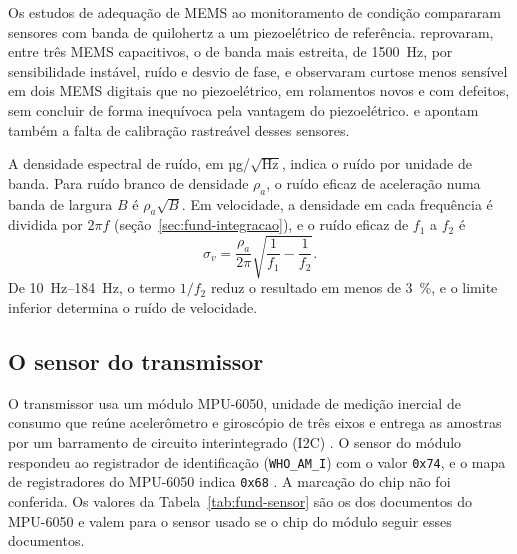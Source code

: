 Os estudos de adequação de MEMS ao monitoramento de condição compararam sensores com banda de quilohertz a um piezoelétrico de referência.  reprovaram, entre três MEMS capacitivos, o de banda mais estreita, de \SI{1500}{\hertz}, por sensibilidade instável, ruído e desvio de fase, e  observaram curtose menos sensível em dois MEMS digitais que no piezoelétrico, em rolamentos novos e com defeitos, sem concluir de forma inequívoca pela vantagem do piezoelétrico.  e  apontam também a falta de calibração rastreável desses sensores.

A densidade espectral de ruído, em µg/$\sqrt{\text{Hz}}$, indica o ruído por unidade de banda. Para ruído branco de densidade $\rho_a$, o ruído eficaz de aceleração numa banda de largura $B$ é $\rho_a\sqrt{B}$. Em velocidade, a densidade em cada frequência é dividida por $2\pi f$ (seção~\ref{sec:fund-integracao}), e o ruído eficaz de $f_1$ a $f_2$ é
\begin{equation}
\sigma_v = \frac{\rho_a}{2\pi}\sqrt{\frac{1}{f_1} - \frac{1}{f_2}}.
\label{eq:fund-ruido-velocidade}
\end{equation}
De \SIrange{10}{184}{\hertz}, o termo $1/f_2$ reduz o resultado em menos de \SI{3}{\percent}, e o limite inferior determina o ruído de velocidade.

\subsection{O sensor do transmissor}\label{sec:fund-sensor}

O transmissor usa um módulo MPU-6050, unidade de medição inercial de consumo que reúne acelerômetro e giroscópio de três eixos e entrega as amostras por um barramento de circuito interintegrado (I2C) \cite{invensense2011ps}. O sensor do módulo respondeu ao registrador de identificação (\texttt{WHO\_AM\_I}) com o valor \texttt{0x74}, e o mapa de registradores do MPU-6050 indica \texttt{0x68} \cite{invensense2012rm}. A marcação do chip não foi conferida. Os valores da Tabela~\ref{tab:fund-sensor} são os dos documentos do MPU-6050 e valem para o sensor usado se o chip do módulo seguir esses documentos.

